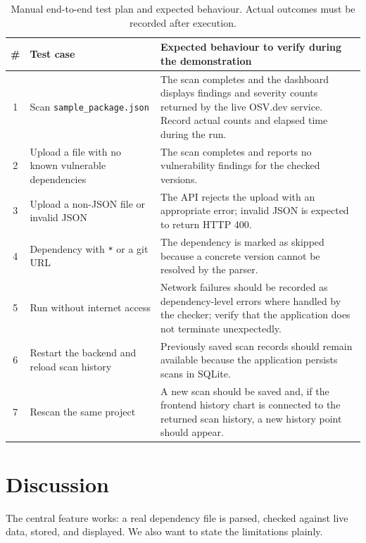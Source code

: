 \documentclass[12pt,a4paper]{report}
\begin{document}
\begin{table}[htbp]
\centering
\small
\begin{tabularx}{\textwidth}{c >{\raggedright\arraybackslash}p{3.4cm} X}
\toprule
\textbf{\#} & \textbf{Test case} & \textbf{Expected behaviour to verify during the demonstration} \\
\midrule
1 & Scan \texttt{sample\_package.json} & The scan completes and the dashboard displays findings and severity counts returned by the live OSV.dev service. Record actual counts and elapsed time during the run. \\
2 & Upload a file with no known vulnerable dependencies & The scan completes and reports no vulnerability findings for the checked versions. \\
3 & Upload a non-JSON file or invalid JSON & The API rejects the upload with an appropriate error; invalid JSON is expected to return HTTP 400. \\
4 & Dependency with \texttt{*} or a git URL & The dependency is marked as skipped because a concrete version cannot be resolved by the parser. \\
5 & Run without internet access & Network failures should be recorded as dependency-level errors where handled by the checker; verify that the application does not terminate unexpectedly. \\
6 & Restart the backend and reload scan history & Previously saved scan records should remain available because the application persists scans in SQLite. \\
7 & Rescan the same project & A new scan should be saved and, if the frontend history chart is connected to the returned scan history, a new history point should appear. \\
\bottomrule
\end{tabularx}
\caption{Manual end-to-end test plan and expected behaviour. Actual outcomes must be recorded after execution.}
\end{table}

\section{Discussion}\label{sec:limits}
The central feature works: a real dependency file is parsed, checked against live data, stored, and displayed. We also want to state the limitations plainly.
\end{document}
